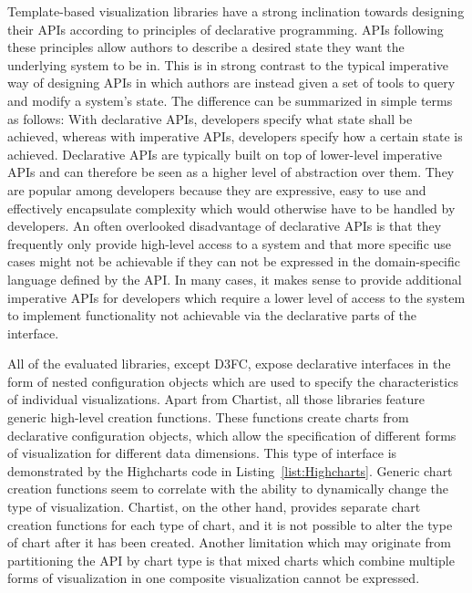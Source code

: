 Template-based visualization libraries have a strong inclination
towards designing their APIs according to principles of declarative
programming. APIs following these principles allow authors to
describe a desired state they want the underlying system to be in.
This is in strong contrast to the typical imperative way of designing
APIs in which authors are instead given a set of tools to query and
modify a system's state. The difference can be summarized in simple
terms as follows: With declarative APIs, developers specify what state
shall be achieved, whereas with imperative APIs, developers specify
how a certain state is achieved. Declarative APIs are typically built
on top of lower-level imperative APIs and can therefore be seen as a
higher level of abstraction over them. They are popular among
developers because they are expressive, easy to use and effectively
encapsulate complexity which would otherwise have to be handled by
developers. An often overlooked disadvantage of declarative APIs is
that they frequently only provide high-level access to a system and
that more specific use cases might not be achievable if they can not
be expressed in the domain-specific language defined by the API. In
many cases, it makes sense to provide additional imperative APIs for
developers which require a lower level of access to the system to
implement functionality not achievable via the declarative parts of
the interface.

All of the evaluated libraries, except D3FC, expose declarative
interfaces in the form of nested configuration objects which are used
to specify the characteristics of individual visualizations. Apart
from Chartist, all those libraries feature generic high-level creation
functions. These functions create charts from declarative
configuration objects, which allow the specification of different
forms of visualization for different data dimensions. This type of
interface is demonstrated by the Highcharts code in
Listing~\ref{list:Highcharts}. Generic chart creation functions seem
to correlate with the ability to dynamically change the type of
visualization. Chartist, on the other hand, provides separate chart
creation functions for each type of chart, and it is not possible to
alter the type of chart after it has been created. Another limitation
which may originate from partitioning the API by chart type is that
mixed charts which combine multiple forms of visualization in one
composite visualization cannot be expressed.


\begin{samepage}
%
A basic column (vertical bar) chart defined using Highcharts' generic
chart creation API. A high-level, declarative configuration object is
passed to the creation function.
},
]{listings/highcharts.js}
\end{samepage}




